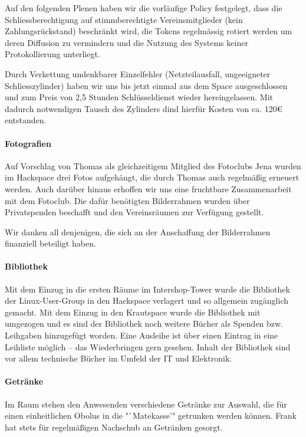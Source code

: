 \documentclass[10pt,DIV16]{scrartcl}
\begin{document}
Auf den folgenden Plenen haben wir die vorl\"aufige Policy festgelegt,
dass die Schliessberechtigung auf stimmberechtigte Vereinsmitglieder
(kein Zahlungsr\"uckstand) beschr\"ankt wird, die Tokens regelm\"assig
rotiert werden um deren Diffusion zu vermindern und die Nutzung des
Systems keiner Protokollierung unterliegt.

Durch Verkettung undenkbarer Einzelfehler (Netzteilausfall, 
ungeeigneter Schliesszylinder) haben wir uns bis jetzt einmal aus 
dem Space ausgeschlossen und zum Preis von 2,5 Stunden 
Schlüsseldienst wieder hereingelassen. Mit dadurch notwendigen 
Tausch des Zylinders dind hierfür Kosten von ca. 120€ entstanden. 

\paragraph{Fotografien}

Auf Vorschlag von Thomas als gleichzeitigem Mitglied des Fotoclubs
Jena wurden im Hackspace drei Fotos aufgehängt, die durch Thomas
auch regelmäßig erneuert werden.  Auch darüber hinaus erhoffen wir
uns eine fruchtbare Zusammenarbeit mit dem Fotoclub. Die dafür
benötigten Bilderrahmen wurden über Privatspenden beschafft und den
Vereinsräumen zur Verfügung gestellt.

Wir danken all denjenigen, die sich an der Anschaffung der Bilderrahmen
finanziell beteiligt haben.

\paragraph{Bibliothek}

Mit dem Einzug in die ersten Räume im Intershop-Tower wurde die
Bibliothek der Linux-User-Group in den Hackspace verlagert und so
allgemein zugänglich gemacht. Mit dem Einzug in den Krautspace wurde
die Bibliothek mit umgezogen und es sind der Bibliothek noch weitere
Bücher als Spenden bzw. Leihgaben hinzugefügt worden. Eine Ausleihe
ist über einen Eintrag in eine Leihliste möglich -- das
Wiederbringen gern gesehen. Inhalt der Bibliothek sind vor allem
technische Bücher im Umfeld der IT und Elektronik.

\paragraph{Getränke}

Im Raum stehen den Anwesenden verschiedene Getränke zur Auswahl, die 
für einen einheitlichen Obolus in die "`Matekasse'" getrunken werden 
können. Frank hat stets für regelmäßigen Nachschub an Getränken 
gesorgt.
\end{document}
